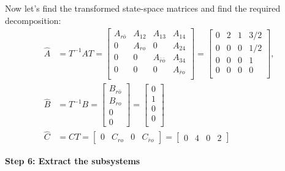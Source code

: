 \documentclass[twoside, 11pt, a4paper]{article}
\begin{document}
Now let's find the transformed state-space matrices 
and find the required decomposition:
\begin{align*}
    \hat{A} &= T^{-1} A T =  
    \left[ \begin{array}{c|c|c|c} A_{r\bar{o}} & A_{12} & A_{13} & A_{14} \\ \hline 
    0 & A_{ro} & 0 & A_{24} \\ \hline 
    0 & 0 & A_{\bar{r}\bar{o}} & A_{34} \\ \hline 
    0 & 0 & 0 & A_{\bar{r}o} \\ 
    \end{array} \right] =
    \left[ \begin{array}{c|c|c|c} 0 & 2 & 1 & 3/2 \\ \hline 
    0 & 0 & 0 & 1/2 \\ \hline 
    0 & 0 & 0 & 1 \\ \hline 
    0 & 0 & 0 & 0 \\ 
    \end{array} \right] ,
    \\
    \hat{B} &= T^{-1} B = \left[ \begin{array}{c} B_{r\bar{o}} \\ B_{ro} \\ 0 \\ 0 \end{array} \right]
    =
    \left[ \begin{array}{c} 0  \\ \hline 
    1 \\ \hline 
    0 \\ \hline 
    0 \\ 
    \end{array} \right] \\
    \hat{C} &= C T = \left[ \begin{array}{c|c|c|c} 0 & C_{ro} & 0 & C_{\bar{r}o} \end{array} \right] =
    \left[ \begin{array}{c|c|c|c} 0 & 4 & 0 & 2 \end{array} \right]
\end{align*}

\textbf{Step 6: Extract the subsystems}
\end{document}
